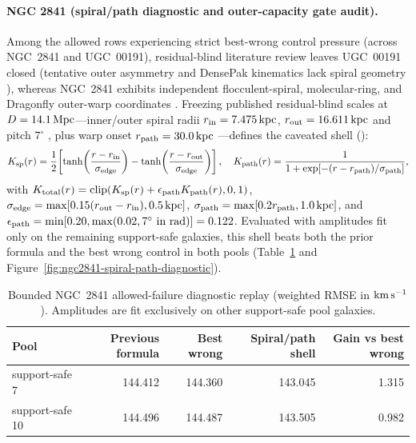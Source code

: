 \documentclass[11pt]{article}
\begin{document}
\paragraph{NGC 2841 (spiral/path diagnostic and outer-capacity gate audit).}
Among the allowed rows experiencing strict best-wrong control pressure (across
NGC~2841 and UGC~00191), residual-blind literature review leaves UGC~00191
closed (tentative outer asymmetry and DensePak kinematics lack spiral geometry
\cite{Laine2014S4GOuterFeatures,KuzioDeNaray2008LSBMassModels}), whereas
NGC~2841 exhibits independent flocculent-spiral, molecular-ring, and Dragonfly
outer-warp coordinates
\cite{ESAHubbleNGC2841,YoungScoville1982MolecularRings,Zhang2018NGC2841Dragonfly}.
Freezing published residual-blind scales at \(D=14.1\,{\rm Mpc}\)---inner/outer
spiral radii \(r_{\rm in}=7.475\,{\rm kpc}\), \(r_{\rm out}=16.611\,{\rm kpc}\)
and pitch \(7^\circ\) \cite{KendallClarkeKennicutt2011SpiralI,KendallClarkeKennicutt2015SpiralII},
plus warp onset \(r_{\rm path}=30.0\,{\rm kpc}\) \cite{Zhang2018NGC2841Dragonfly}---defines
the caveated shell ():
\begin{equation}
  K_{\rm sp}(r)=\frac{1}{2}\!\left[
    \tanh\!\left(\frac{r-r_{\rm in}}{\sigma_{\rm edge}}\right)
    -\tanh\!\left(\frac{r-r_{\rm out}}{\sigma_{\rm edge}}\right)
  \right],
  \quad
  K_{\rm path}(r)=\frac{1}{1+\exp[-(r-r_{\rm path})/\sigma_{\rm path}]},
\end{equation}
with \(K_{\rm total}(r)=\operatorname{clip}(K_{\rm sp}(r)+\epsilon_{\rm path}K_{\rm path}(r),0,1)\),
\(\sigma_{\rm edge}=\max[0.15(r_{\rm out}-r_{\rm in}),0.5\,{\rm kpc}]\),
\(\sigma_{\rm path}=\max[0.2r_{\rm path},1.0\,{\rm kpc}]\), and
\(\epsilon_{\rm path}=\min[0.20,\max(0.02,7^\circ\text{ in rad})]=0.122\).
Evaluated with amplitudes fit only on the remaining support-safe galaxies, this
shell beats both the prior formula and the best wrong control in both pools
(Table~\ref{tab:ngc2841-spiral-path-diagnostic} and
Figure~\ref{fig:ngc2841-spiral-path-diagnostic}).

\begin{table}[htbp]
\centering
\small
\caption{Bounded NGC~2841 allowed-failure diagnostic replay (weighted RMSE in
\({\rm km\,s^{-1}}\)).  Amplitudes are fit exclusively on other support-safe
pool galaxies.}
\label{tab:ngc2841-spiral-path-diagnostic}
\begin{tabular}{lrrrr}
\toprule
Pool & Previous formula & Best wrong & Spiral/path shell & Gain vs best wrong\\
\midrule
support-safe 7 & 144.412 & 144.360 & 143.045 & 1.315\\
support-safe 10 & 144.496 & 144.487 & 143.505 & 0.982\\
\bottomrule
\end{tabular}
\end{table}
\end{document}
